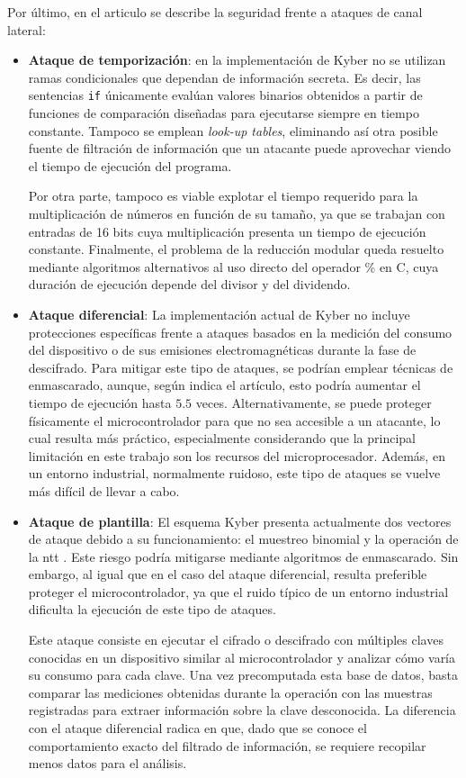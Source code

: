 Por último, en el articulo se describe la seguridad frente a ataques de canal lateral:
\begin{itemize}
	\item \textbf{Ataque de temporización}: en la implementación de Kyber no se utilizan ramas condicionales que dependan de información secreta. Es decir, las sentencias \texttt{if} únicamente evalúan valores binarios obtenidos a partir de funciones de comparación diseñadas para ejecutarse siempre en tiempo constante. Tampoco se emplean \textit{look-up tables}, eliminando así otra posible fuente de filtración de información que un atacante puede aprovechar viendo el tiempo de ejecución del programa.
	\newline
	
	Por otra parte, tampoco es viable explotar el tiempo requerido para la multiplicación de números en función de su tamaño, ya que se trabajan con entradas de 16 bits cuya multiplicación presenta un tiempo de ejecución constante. Finalmente, el problema de la reducción modular queda resuelto mediante algoritmos alternativos al uso directo del operador \% en C, cuya duración de ejecución depende del divisor y del dividendo.
	\item \textbf{Ataque diferencial}: La implementación actual de Kyber no incluye protecciones específicas frente a ataques basados en la medición del consumo del dispositivo o de sus emisiones electromagnéticas durante la fase de descifrado. Para mitigar este tipo de ataques, se podrían emplear técnicas de enmascarado, aunque, según indica el artículo, esto podría aumentar el tiempo de ejecución hasta $5.5$ veces. Alternativamente, se puede proteger físicamente el microcontrolador para que no sea accesible a un atacante, lo cual resulta más práctico, especialmente considerando que la principal limitación en este trabajo son los recursos del microprocesador. Además, en un entorno industrial, normalmente ruidoso, este tipo de ataques se vuelve más difícil de llevar a cabo.
	
	\item \textbf{Ataque de plantilla}: El esquema Kyber presenta actualmente dos vectores de ataque debido a su funcionamiento: el muestreo binomial \cite{Peng_Kuhn_2025} y la operación de la \acrshort{ntt} \cite{cryptoeprint:2019/795}. Este riesgo podría mitigarse mediante algoritmos de enmascarado. Sin embargo, al igual que en el caso del ataque diferencial, resulta preferible proteger el microcontrolador, ya que el ruido típico de un entorno industrial dificulta la ejecución de este tipo de ataques.
	\newline
	
	Este ataque consiste en ejecutar el cifrado o descifrado con múltiples claves conocidas en un dispositivo similar al microcontrolador y analizar cómo varía su consumo para cada clave. Una vez precomputada esta base de datos, basta comparar las mediciones obtenidas durante la operación con las muestras registradas para extraer información sobre la clave desconocida. La diferencia con el ataque diferencial radica en que, dado que se conoce el comportamiento exacto del filtrado de información, se requiere recopilar menos datos para el análisis.
\end{itemize}
\newpage
